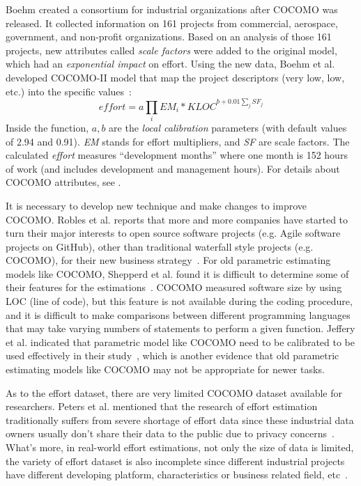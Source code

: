 Boehm created a consortium for
industrial organizations after COCOMO was released.
It collected information on 161 projects from commercial,
aerospace, government, and non-profit organizations.
Based on an analysis of those 161 projects, new attributes called {\em scale factors} were added to the original model, which had an {\em exponential impact}
on effort.
Using the new data, Boehm et al. developed COCOMO-II model that map the project descriptors (very low, low, etc.)
into the specific values~\cite{boehm2000cost}:
\[
\mathit{effort}=a\prod_i EM_i *\mathit{KLOC}^{b+0.01\sum_j SF_j}
\]
Inside the function, $a,b$ are the {\em local calibration} parameters (with default values of 2.94 and 0.91). {\em EM} stands for effort multipliers, and {\em SF} are scale factors. The calculated {\em effort}
measures ``development months'' where one month is 152 hours of work  (and includes development and management hours). For details about COCOMO attributes, see .

It is necessary to develop new technique and make changes to improve COCOMO. Robles et al. reports that more and more companies have started to turn their major interests to open source software projects (e.g. Agile software projects on GitHub), other than traditional waterfall style projects (e.g. COCOMO), for their new business strategy~\cite{robles2014estimating}. For old parametric estimating models like COCOMO, Shepperd et al. found it is difficult to determine some of their features for the estimations~\cite{shepperd2007software}. COCOMO measured software size by using LOC (line of code), but this feature is not available during the coding procedure, and it is difficult to make comparisons between different programming languages that may take varying numbers of statements to perform a given function. Jeffery et al. indicated that parametric model like COCOMO need to be calibrated to be used effectively in their study~\cite{jeffery1990calibrating}, which is another evidence that old parametric estimating models like COCOMO may not be appropriate for newer tasks. 

As to the effort dataset, there are very limited COCOMO dataset available for researchers. Peters et al. mentioned that the research of effort estimation traditionally suffers from severe shortage of effort data since these industrial data owners usually don't share their data to the public due to privacy concerns~\cite{peters2012privacy}. What's more, in real-world effort estimations, not only the size of data is limited, the variety of effort dataset is also incomplete since different industrial projects have different developing platform, characteristics or business related field, etc~\cite{qi2017software}.



